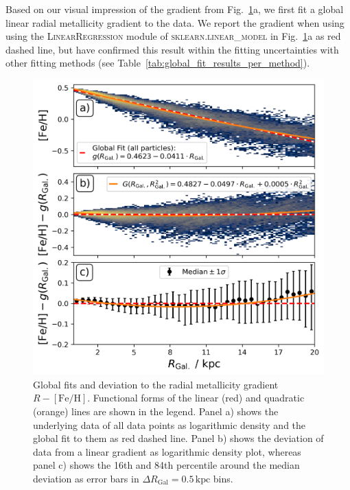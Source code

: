 \documentclass[fleqn,usenatbib]{mnras}
\begin{document}


Based on our visual impression of the gradient from Fig.~\ref{fig:global_r_feh_fit}a, we first fit a global linear radial metallicity gradient to the data. We report the gradient when using using the \textsc{LinearRegression} module of \textsc{sklearn.linear\_model} \citep{scikit-learn} in Fig.~\ref{fig:global_r_feh_fit}a as red dashed line, but have confirmed this result within the fitting uncertainties with other fitting methods (see Table~\ref{tab:global_fit_results_per_method}).

\begin{figure}
    \centering
    \includegraphics[width=\columnwidth]{figures/global_r_feh_fit.png}
    \caption{Global fits and deviation to the radial metallicity gradient $R-\mathrm{[Fe/H]}$. Functional forms of the linear (red) and quadratic (orange) lines are shown in the legend. Panel a) shows the underlying data of all data points as logarithmic density and the global fit to them as red dashed line. Panel b) shows the deviation of data from a linear gradient as logarithmic density plot, whereas panel c) shows the 16th and 84th percentile around the median deviation as error bars in $\Delta R_\mathrm{Gal} = 0.5\,\mathrm{kpc}$ bins.}
    \label{fig:global_r_feh_fit}
\end{figure}
\end{document}
